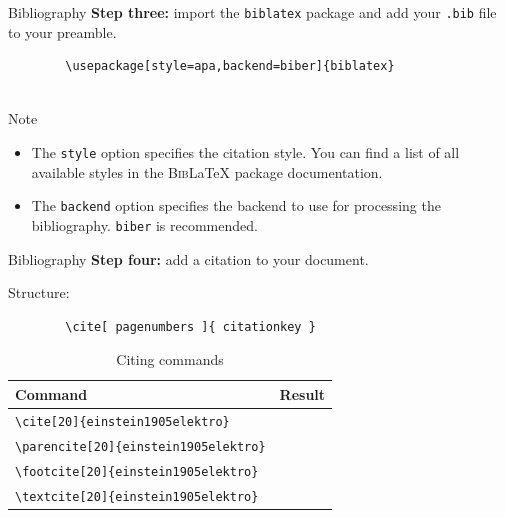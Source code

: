 \documentclass{beamer}
\newcommand{\code}[1]{\texttt{#1}}
\newcommand{\filename}[1]{\texttt{#1}}
\newcommand{\commandopt}[3]{\texttt{\textbackslash#1[#3]\{#2\}}}
\newcommand{\biblatex}{{\rmfamily\scshape{}Bib}\LaTeX{}}
\begin{document}
\begin{frame}[fragile]{Bibliography}
    \textbf{Step three:} import the \texttt{biblatex} package and add your \filename{.bib} file to your preamble.
    \medskip
    \centering
    \small
    \begin{verbatim}
        \usepackage[style=apa,backend=biber]{biblatex}
        
    \end{verbatim}

    \begin{block}{Note}
        \small
        \begin{itemize}
            \item  The \code{style} option specifies the citation style. You can find a list of all available styles in the \biblatex{} package documentation.
            \item The \code{backend} option specifies the backend to use for processing the bibliography. \code{biber} is recommended.
        \end{itemize}
    \end{block}
\end{frame}

\begin{frame}[fragile]{Bibliography}
    \textbf{Step four:} add a citation to your document.

    Structure:

    \begin{verbatim}
        \cite[ pagenumbers ]{ citationkey }
    \end{verbatim}

    \begin{table}[ht]
        \centering
        \scriptsize
        \begin{tabular}{ll}
            \toprule
            \textbf{Command}                                  & \textbf{Result}                          \\
            \midrule
            \commandopt{cite}{einstein1905elektro}{20}      & \cite[20]{einstein1905elektro}      \\
            \commandopt{parencite}{einstein1905elektro}{20} & \parencite[20]{einstein1905elektro} \\
            \commandopt{footcite}{einstein1905elektro}{20}  & \footnotemark                            \\
            \commandopt{textcite}{einstein1905elektro}{20}  & \textcite[20]{einstein1905elektro}  \\
            \bottomrule
        \end{tabular}
        \caption{Citing commands}\label{tblcite}
    \end{table}
\end{frame}
\end{document}

